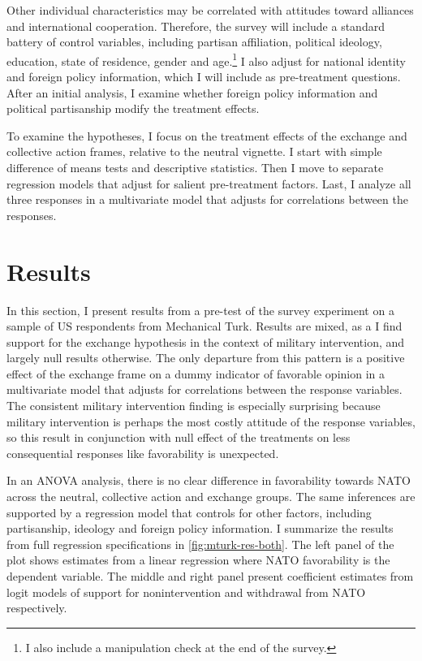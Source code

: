 \documentclass[12pt]{article}
\begin{document}
Other individual characteristics may be correlated with attitudes toward alliances and international cooperation. 
Therefore, the survey will include a standard battery of control variables, including partisan affiliation, political ideology, education, state of residence, gender and age.\footnote{I also include a manipulation check at the end of the survey.} 
I also adjust for national identity \citep{Herrmannetal2009} and foreign policy information, which I will include as pre-treatment questions. 
After an initial analysis, I examine whether foreign policy information and political partisanship modify the treatment effects.


To examine the hypotheses, I focus on the treatment effects of the exchange and collective action frames, relative to the neutral vignette. 
I start with simple difference of means tests and descriptive statistics. 
Then I move to separate regression models that adjust for salient pre-treatment factors. 
Last, I analyze all three responses in a multivariate model that adjusts for correlations between the responses. 



\section{Results} 

In this section, I present results from a pre-test of the survey experiment on a sample of US respondents from Mechanical Turk. 
Results are mixed, as a I find support for the exchange hypothesis in the context of military intervention, and largely null results otherwise.
The only departure from this pattern is a positive effect of the exchange frame on a dummy indicator of favorable opinion in a multivariate model that adjusts for correlations between the response variables.  
The consistent military intervention finding is especially surprising because military intervention is perhaps the most costly attitude of the response variables, so this result in conjunction with null effect of the treatments on less consequential responses like favorability is unexpected. 


In an ANOVA analysis, there is no clear difference in favorability towards NATO across the neutral, collective action and exchange groups. 
The same inferences are supported by a regression model that controls for other factors, including partisanship, ideology and foreign policy information.
I summarize the results from full regression specifications in \autoref{fig:mturk-res-both}. 
The left panel of the plot shows estimates from a linear regression where NATO favorability is the dependent variable. 
The middle and right panel present coefficient estimates from logit models of support for nonintervention and withdrawal from NATO respectively. 
\end{document}
